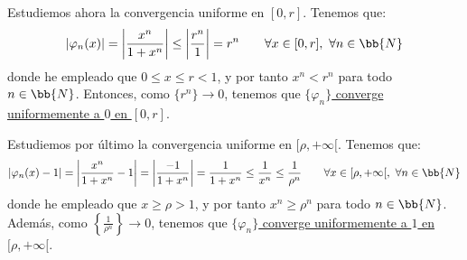 \begin{ejercicio}
    Estudiemos ahora la convergencia uniforme en $[0,r]$. Tenemos que:
    \begin{equation*}
        \left|\varphi_n(x)\right| = \left|\frac{x^n}{1+x^n}\right| \leq \left|\frac{r^n}{1}\right| = r^n \qquad \forall x\in [0,r],~\forall n\in \bb{N}
    \end{equation*}
    donde he empleado que $0\leq x\leq r<1$, y por tanto $x^n < r^n$ para todo $n\in \bb{N}$.
    Entonces, como $\{r^n\}\to 0$, tenemos que \ul{$\{\varphi_n\}$ converge uniformemente a $0$ en $[0,r]$}.

    Estudiemos por último la convergencia uniforme en $[\rho,+\infty[$. Tenemos que:
    \begin{equation*}
        \left|\varphi_n(x)-1\right| = \left|\frac{x^n}{1+x^n}-1\right| = \left|\frac{-1}{1+x^n}\right| = \frac{1}{1+x^n}
        \leq \frac{1}{x^n} \leq \frac{1}{\rho^n} \qquad \forall x\in [\rho,+\infty[,~\forall n\in \bb{N}
    \end{equation*}
    donde he empleado que $x\geq \rho>1$, y por tanto $x^n \geq \rho^n$ para todo $n\in \bb{N}$. Además,
    como $\left\{\frac{1}{\rho^n}\right\}\to 0$, tenemos que \ul{$\{\varphi_n\}$ converge uniformemente a $1$ en $[\rho,+\infty[$}.
\end{ejercicio}


